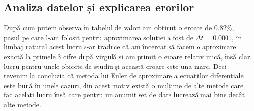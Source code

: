 \documentclass[12pt, a4paper]{article}
\begin{document}
\subsection{Analiza datelor și explicarea erorilor}
\hspace{0.4cm}După cum putem observa în tabelul de valori am obținut o eroare de $0.82\%$, pasul pe care l-am folosit pentru aproximarea soluției a fost de $\Delta t = 0.0001$, în limbaj natural acest lucru s-ar traduce că am încercat să facem o aproximare exactă la primele 3 cifre după virgulă și am primit o eroare relativ mică, însă clar lucru pentru unele obiecte de studiu și această eroare este una mare. Deci revenim la concluzia că metoda lui Euler de aproximare a ecuațiilor diferențiale este bună în unele cazuri, din acest motiv există o mulțime de alte metode care fac acelați lucru însă care pentru un anumit set de date lucrează mai bine decât alte metode.

\newpage
\end{document}
